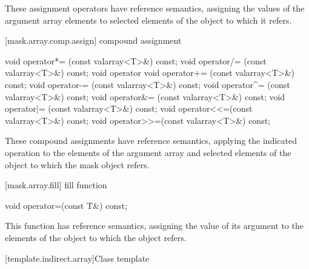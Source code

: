 \begin{itemdescr}
\pnum
These assignment operators have reference semantics, assigning the values
of the argument array elements to selected elements of the
object to which it refers.
\end{itemdescr}

[mask.array.comp.assign]{ compound assignment}

%
%
%
%
%
%
%
%
%
%
\begin{itemdecl}
void operator*= (const valarray<T>&) const;
void operator/= (const valarray<T>&) const;
void operator%
void operator+= (const valarray<T>&) const;
void operator-= (const valarray<T>&) const;
void operator^= (const valarray<T>&) const;
void operator&= (const valarray<T>&) const;
void operator|= (const valarray<T>&) const;
void operator<<=(const valarray<T>&) const;
void operator>>=(const valarray<T>&) const;
\end{itemdecl}

\begin{itemdescr}
\pnum
These compound assignments have reference semantics, applying the
indicated operation to the elements of the argument array and selected elements
of the
object to which the mask object refers.
\end{itemdescr}

[mask.array.fill]{ fill function}

%
\begin{itemdecl}
void operator=(const T&) const;
\end{itemdecl}

\begin{itemdescr}
\pnum
This function has reference semantics, assigning the value of its
argument to the elements of the
object to which the
object refers.
\end{itemdescr}

[template.indirect.array]{Class template }

